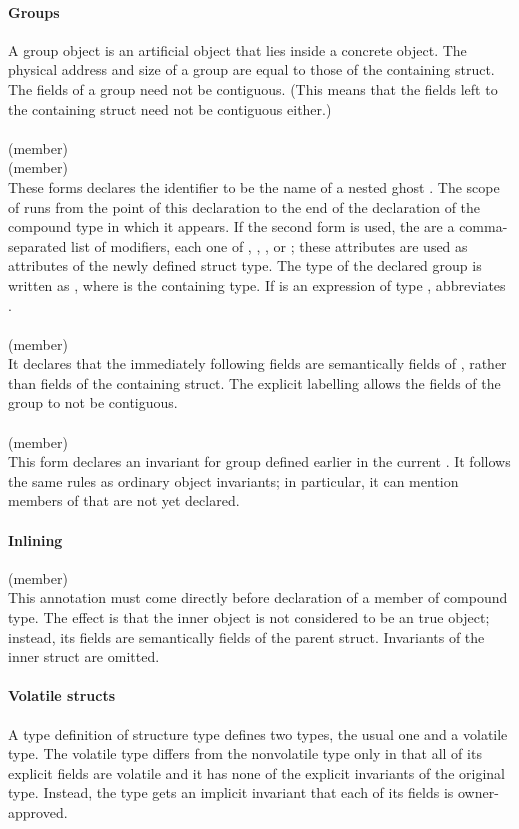 \documentclass[preprint,nocopyrightspace]{sigplanconf}
\newcommand{\subsubsubsection}[1]{\paragraph{#1}}
\begin{document}
{{{{\subsubsubsection{Groups}
A group object is an artificial object that lies inside a
concrete  object. The physical address and size of a group
are equal to those of the containing struct. The fields of a group
need not be contiguous. (This means that the fields left to the
containing struct need not be contiguous either.)
\\\\
\noindent{} (member)\\
 (member)\\
These forms declares the identifier  to be the name of a nested
ghost . The scope of  runs from the point of this
declaration to the end of the declaration of the compound type in
which it appears.
If the second form is used,
the  are a comma-separated list of modifiers,
each one of , , ,
or ; these attributes are used as attributes of the
newly defined struct type.
The type of the declared group is written as , where 
is the containing  type. If  is an expression of
type ,  abbreviates .
\\\\
 (member)\\
It declares that the immediately
following fields are semantically fields of , rather than fields of
the containing struct. The explicit labelling allows the fields of the
group to not be contiguous.
\\\\
 (member)\\
This form declares an invariant for group  defined earlier in
the current . It follows the same rules as ordinary object
invariants; in particular, it can mention members of  that are
not yet declared.

\subsubsubsection{Inlining}

 (member)\\
This annotation must come directly before declaration of a member of compound
type. The effect is that the inner object is not considered to be an
true object; instead, its fields are semantically fields of the
parent struct. Invariants of the inner struct are omitted.

\subsubsubsection{Volatile structs}
A type definition of structure type defines two types, the usual one
and a volatile type. The volatile type differs from the nonvolatile
type only in that all of its explicit fields are volatile and it has
none of the explicit invariants of the original type. Instead, the
type gets an implicit invariant that each of its fields is
owner-approved. 

}}}}
\end{document}
